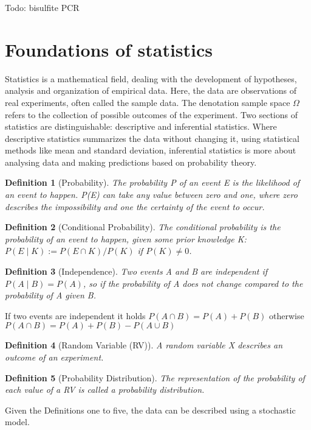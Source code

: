 Todo: bisulfite PCR

\section{Foundations of statistics} 
\label{section:statistics}
Statistics is a mathematical field, dealing with the development of hypotheses, analysis and organization of empirical data. Here, the data are observations of real experiments, often called the sample data. The denotation sample space $\Omega$ refers to the collection of possible outcomes of the experiment.\cite{Philosophy} Two sections of statistics are distinguishable: descriptive and inferential statistics. Where descriptive statistics summarizes the data without changing it, using statistical methods like mean and standard deviation, inferential statistics is more about analysing data and making predictions based on probability theory.\cite{Introduction}\\
\newtheorem{definition}{Definition}
\begin{definition}[Probability]
The probability P of an event E is the likelihood of an event to happen. P(E) can take any value between zero and one, where zero describes the impossibility and one the certainty of the event to occur.
\end{definition}
\begin{definition}[Conditional Probability]
The conditional probability is the probability of an event to happen, given some prior knowledge K:\newline
$P(E \mid K) := P(E \cap K) / P(K)$ if $P(K) \neq 0$. 
\end{definition}
\begin{definition}[Independence]
Two events A and B are independent if $P(A \mid B) = P(A)$, so if the probability of A does not change compared to the probability of A given B.
\end{definition}
If two events are independent it holds $P(A \cap B) = P(A) + P(B)$ otherwise $P(A \cap B) = P(A) + P(B) - P(A \cup B)$
\begin{definition}[Random Variable (RV)]
A random variable X describes an outcome of an experiment.
\end{definition}
\begin{definition}[Probability Distribution]
The representation of the probability of each value of a \ac{RV} is called a probability distribution.
\end{definition}
Given the Definitions one to five, the data can be described using a stochastic model.

